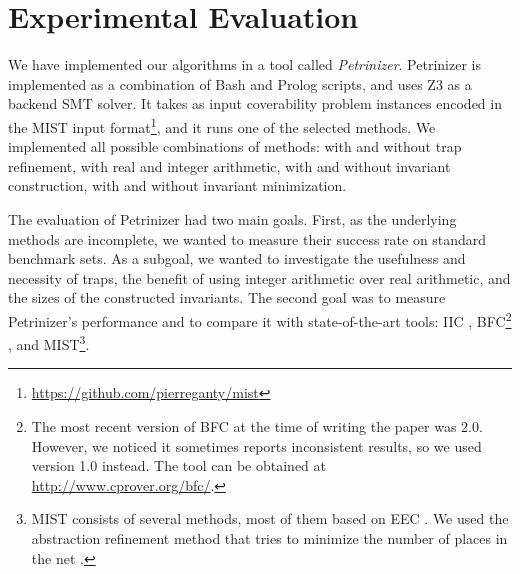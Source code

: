 \section{Experimental Evaluation}
\label{sec_experiments}

We have implemented our algorithms in a tool called
\emph{Pe\-tri\-ni\-zer}. 
Petrinizer is implemented as a combination of Bash and Prolog scripts,
and uses Z3 \cite{MouraB08} as a backend SMT solver.
It takes as input coverability problem instances encoded in the MIST
input format\footnote{\url{https://github.com/pierreganty/mist}}, and it
runs one of the selected methods. 
We implemented all possible combinations of
methods: with and without trap refinement, with real and integer arithmetic,
with and without invariant construction, with and without invariant
minimization.

The evaluation of Petrinizer had two main goals. First, as the underlying
methods are incomplete, we wanted to measure their success rate on standard
benchmark sets. 
As a subgoal, we wanted to investigate
the usefulness and necessity of traps, the benefit of using integer arithmetic
over real arithmetic, and the sizes of the constructed invariants.
The second goal was to measure Petrinizer's performance and to compare it
with state-of-the-art tools: IIC \cite{KloosMNP13}, BFC\footnote{The most recent version of BFC at the time of
writing the paper was 2.0. However, we noticed it sometimes reports
inconsistent results, so we used version 1.0 instead. The tool can be
obtained at \url{http://www.cprover.org/bfc/}.} \cite{KaiserKWCONCUR12}, and
MIST\footnote{MIST consists of several methods, most of them based on
  EEC \cite{GeeraertsRB06}. We used the abstraction
  refinement method that tries to minimize the number of places in the net \cite{GantyFI08}.}.

